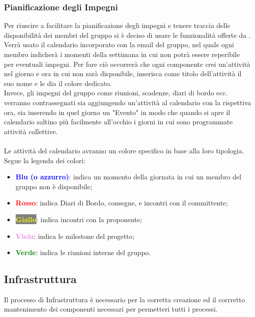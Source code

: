 \documentclass[a4paper,12pt]{article}
\begin{document}
        \subsubsection{Pianificazione degli Impegni} \label{sec:pianificazioneImpegni}
            Per riuscire a facilitare la pianificazione degli impegni e tenere traccia delle disponibilità dei membri del gruppo si è deciso di usare le funzionalità offerte da \textbf{\underline{}}.
            Verrà usato il calendario incorporato con la email del gruppo, nel quale ogni membro indicherà i momenti della settimana in cui non potrà essere reperibile per eventuali impegni.
            Per fare ciò occorrerà che ogni componente crei un'attività nel giorno e ora in cui non sarà disponibile, inserisca come titolo dell'attività il suo nome e le dia il colore dedicato.\\
            Invece, gli impegni del gruppo come riunioni, scadenze, diari di bordo ecc. verranno contrassegnati sia aggiungendo un'attività al calendario con la rispettiva ora, sia inserendo in quel giorno un "Evento" in modo che quando si apre il calendario saltino più facilmente all'occhio i giorni in cui sono programmate attività collettive.\\\\
            Le attività del calendario avranno un colore specifico in base alla loro tipologia.
            Segue la legenda dei colori:
            \begin{itemize}
                \item \textbf{\textcolor{blue}{Blu (o azzurro)}}: indica un momento della giornata in cui un membro del gruppo non è disponibile;
                \item \textbf{\textcolor{red}{Rosso}}: indica Diari di Bordo, consegne, e incontri con il committente;
                \item \colorbox{gray}{\textbf{\textcolor{yellow}{Giallo}}}: indica incontri con la proponente;
                \item \textbf{\textcolor{violet}{Viola}}: indica le milestone del progetto;
                \item \textbf{\textcolor{green}{Verde}}: indica le riunioni interne del gruppo.
            \end{itemize}

    \subsection{Infrastruttura}
        Il processo di Infrastruttura è necessario per la corretta creazione ed il corrretto mantenimento dei componenti necessari per permetteri tutti i processi.
\end{document}
